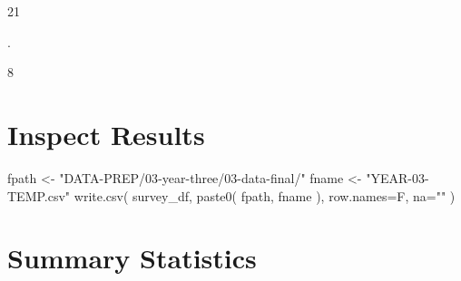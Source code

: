 \documentclass[
  letterpaper,
]{scrbook}
\newenvironment{Shaded}{\begin{snugshade}}{\end{snugshade}}
\newcommand{\AttributeTok}[1]{\textcolor[rgb]{0.40,0.45,0.13}{#1}}
\newcommand{\FunctionTok}[1]{\textcolor[rgb]{0.28,0.35,0.67}{#1}}
\newcommand{\NormalTok}[1]{\textcolor[rgb]{0.00,0.23,0.31}{#1}}
\newcommand{\OtherTok}[1]{\textcolor[rgb]{0.00,0.23,0.31}{#1}}
\newcommand{\StringTok}[1]{\textcolor[rgb]{0.13,0.47,0.30}{#1}}
\begin{document}
21

.

8

\chapter{Inspect Results}\label{inspect-results}

\begin{Shaded}
\begin{Highlighting}[]
\NormalTok{fpath }\OtherTok{\textless{}{-}} \StringTok{"DATA{-}PREP/03{-}year{-}three/03{-}data{-}final/"}
\NormalTok{fname }\OtherTok{\textless{}{-}} \StringTok{"YEAR{-}03{-}TEMP.csv"}
\FunctionTok{write.csv}\NormalTok{( survey\_df, }\FunctionTok{paste0}\NormalTok{( fpath, fname ), }\AttributeTok{row.names=}\NormalTok{F, }\AttributeTok{na=}\StringTok{""}\NormalTok{ )}
\end{Highlighting}
\end{Shaded}

\chapter{Summary Statistics}\label{summary-statistics-1}
\end{document}
